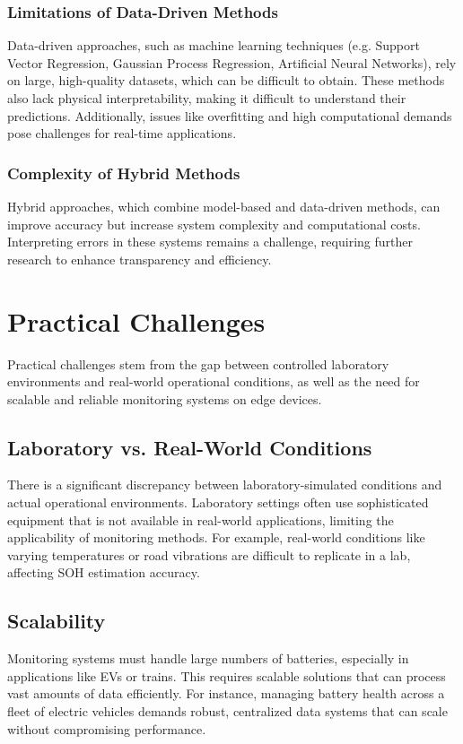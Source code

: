 \subsubsection{Limitations of Data-Driven Methods}
Data-driven approaches, such as machine learning techniques (e.g. Support Vector Regression, Gaussian Process Regression, Artificial Neural Networks), rely on large, high-quality datasets, which can be difficult to obtain. 
These methods also lack physical interpretability, making it difficult to understand their predictions. 
Additionally, issues like overfitting and high computational demands pose challenges for real-time applications.

\subsubsection{Complexity of Hybrid Methods}
Hybrid approaches, which combine model-based and data-driven methods, can improve accuracy but increase system complexity and computational costs. 
Interpreting errors in these systems remains a challenge, requiring further research to enhance transparency and efficiency.

\section{Practical Challenges}
Practical challenges stem from the gap between controlled laboratory environments and real-world operational conditions, as well as the need for scalable and reliable monitoring systems on edge devices.

\subsection{Laboratory vs. Real-World Conditions}
There is a significant discrepancy between laboratory-simulated conditions and actual operational environments. 
Laboratory settings often use sophisticated equipment that is not available in real-world applications, limiting the applicability of monitoring methods. For example, real-world conditions like varying temperatures or road vibrations are difficult to replicate in a lab, affecting SOH estimation accuracy.

\subsection{Scalability}
Monitoring systems must handle large numbers of batteries, especially in applications like EVs or trains. 
This requires scalable solutions that can process vast amounts of data efficiently. 
For instance, managing battery health across a fleet of electric vehicles demands robust, centralized data systems that can scale without compromising performance.

